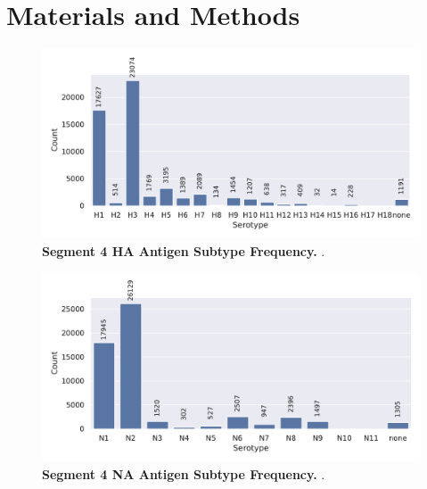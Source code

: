 \chapter{Materials and Methods} \label{chap:Materials_and_Methods}

\begin{figure}[!hbt]
    \includegraphics[width=\dimexpr\textwidth-2\fboxsep-2\fboxrule,fbox]{PCA/Data_Overview_Segment_4_H.pdf}
    \caption[Segment 4 \Acrlong{HA} Antigen Subtype Frequency]{\textbf{Segment 4 \Acrlong{HA} Antigen Subtype Frequency.} .}
    \label{fig:Frequency_4}
\end{figure}

\begin{figure}[!hbt]
    \includegraphics[width=\dimexpr\textwidth-2\fboxsep-2\fboxrule,fbox]{PCA/Data_Overview_Segment_6_N.pdf}
    \caption[Segment 6 \Acrlong{NA} Antigen Subtype Frequency]{\textbf{Segment 4 \Acrlong{NA} Antigen Subtype Frequency.} .}
    \label{fig:Frequency_6}
\end{figure}













